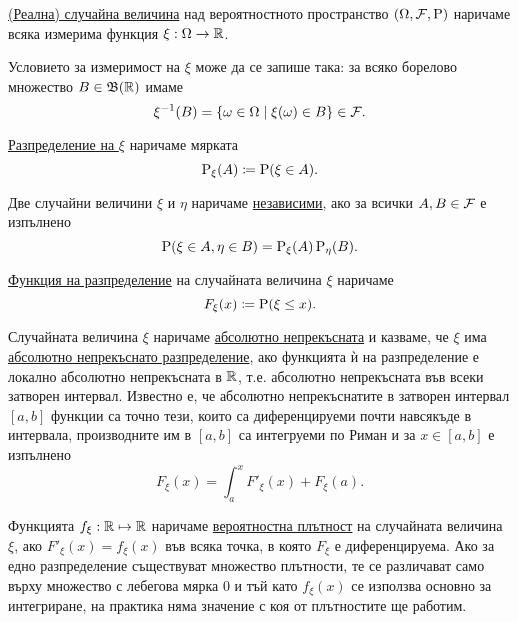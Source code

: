 \documentclass[numbers=endperiod, DIV=15, bibliography=totocnumbered]{scrartcl}
\begin{document}
\begin{definition}
  \uline{(Реална) случайна величина} над вероятностното пространство $(\Omega, \mathcal{F}, \operatorname{P})$ наричаме всяка измерима функция $\xi : \Omega \to \mathbb{R}$.

  Условието за измеримост на $\xi$ може да се запише така: за всяко борелово множество $B \in \mathfrak{B}(\mathbb{R})$ имаме
  \begin{displaymath}
    \xi^{-1} (B) = \{ \omega \in \Omega \mid \xi(\omega) \in B \} \in \mathcal{F}.
  \end{displaymath}

  \uline{Разпределение на $\xi$} наричаме мярката
  \begin{displaymath}
    \operatorname{P}_\xi(A) \coloneqq \operatorname{P}(\xi \in A).
  \end{displaymath}

  Две случайни величини $\xi$ и $\eta$ наричаме \uline{независими}, ако за всички $A, B \in \mathcal{F}$ е изпълнено
  \begin{displaymath}
    \operatorname{P}(\xi \in A, \eta \in B) = \operatorname{P}_\xi(A) \operatorname{P}_\eta(B).
  \end{displaymath}

  \uline{Функция на разпределение} на случайната величина $\xi$ наричаме
  \begin{displaymath}
    F_\xi(x) \coloneqq \operatorname{P}(\xi \leq x).
  \end{displaymath}

  Случайната величина $\xi$ наричаме \uline{абсолютно непрекъсната} и казваме, че $\xi$ има \uline{абсолютно непрекъснато разпределение}, ако функцията ѝ на разпределение е локално абсолютно непрекъсната в $\mathbb{R}$, т.е. абсолютно непрекъсната във всеки затворен интервал. Известно е, че абсолютно непрекъснатите в затворен интервал $[a, b]$ функции са точно тези, които са диференцируеми почти навсякъде в интервала, производните им в $[a, b]$ са интегруеми по Риман и за $x \in [a, b]$ е изпълнено
  \begin{displaymath}
    F_\xi(x) = \int_a^x F'_\xi(x) + F_\xi(a).
  \end{displaymath}

  Функцията $f_\xi: \mathbb{R} \mapsto \mathbb{R}$ наричаме \uline{вероятностна плътност} на случайната величина $\xi$, ако $F'_\xi(x) = f_\xi(x)$ във всяка точка, в която $F_\xi$ е диференцируема. Ако за едно разпределение съществуват множество плътности, те се различават само върху множество с лебегова мярка 0 и тъй като $f_\xi(x)$ се използва основно за интегриране, на практика няма значение с коя от плътностите ще работим.
\end{definition}
\end{document}
